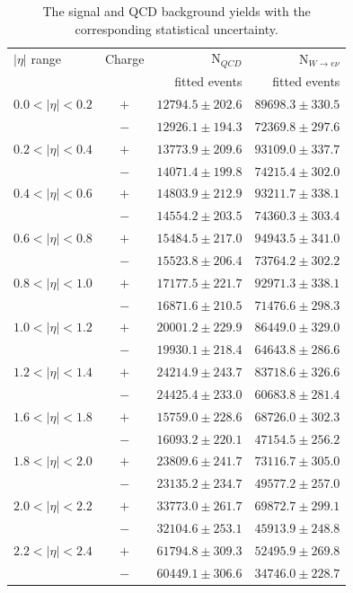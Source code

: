\begin{table}[htbp]
 \begin{center}
 \begin{tabular}{lcrr}
\toprule
$|\eta|$ range &  Charge &  N$_{QCD}$     & N$_{W\rightarrow e \nu}$  \\
               &         & fitted events & fitted events            \\
\midrule
$0.0<| \eta |<0.2$ &  $+$ & $12794.5 \pm 202.6$ &$89698.3\pm330.5$ \\
                   &  $-$ & $12926.1 \pm 194.3$ &$72369.8\pm297.6$ \\ 
$0.2<| \eta |<0.4$ &  $+$ & $13773.9 \pm 209.6$ &$93109.0\pm337.7$ \\
                   &  $-$ & $14071.4 \pm 199.8$ &$74215.4\pm302.0$ \\ 
$0.4<| \eta |<0.6$ &  $+$ & $14803.9 \pm 212.9$ &$93211.7\pm338.1$ \\
                   &  $-$ & $14554.2 \pm 203.5$ &$74360.3\pm303.4$ \\ 
$0.6<| \eta |<0.8$ &  $+$ & $15484.5 \pm 217.0$ &$94943.5\pm341.0$ \\
                   &  $-$ & $15523.8 \pm 206.4$ &$73764.2\pm302.2$ \\ 
$0.8<| \eta |<1.0$ &  $+$ & $17177.5 \pm 221.7$ &$92971.3\pm338.1$ \\
                   &  $-$ & $16871.6 \pm 210.5$ &$71476.6\pm298.3$ \\ 
$1.0<| \eta |<1.2$ &  $+$ & $20001.2 \pm 229.9$ &$86449.0\pm329.0$ \\
                   &  $-$ & $19930.1 \pm 218.4$ &$64643.8\pm286.6$ \\ 
$1.2<| \eta |<1.4$ &  $+$ & $24214.9 \pm 243.7$ &$83718.6\pm326.6$ \\
                   &  $-$ & $24425.4 \pm 233.0$ &$60683.8\pm281.4$ \\ 
$1.6<| \eta |<1.8$ &  $+$ & $15759.0 \pm 228.6$ &$68726.0\pm302.3$ \\
                   &  $-$ & $16093.2 \pm 220.1$ &$47154.5\pm256.2$ \\ 
$1.8<| \eta |<2.0$ &  $+$ & $23809.6 \pm 241.7$ &$73116.7\pm305.0$ \\
                   &  $-$ & $23135.2 \pm 234.7$ &$49577.2\pm257.0$ \\ 
$2.0<| \eta |<2.2$ &  $+$ & $33773.0 \pm 261.7$ &$69872.7\pm299.1$ \\
                   &  $-$ & $32104.6 \pm 253.1$ &$45913.9\pm248.8$ \\ 
$2.2<| \eta |<2.4$ &  $+$ & $61794.8 \pm 309.3$ &$52495.9\pm269.8$ \\
                   &  $-$ & $60449.1 \pm 306.6$ &$34746.0\pm228.7$ \\ 
\bottomrule
 \end{tabular}
 \caption{\label{tab:updatedsigyield} The signal and {QCD} background yields
with the corresponding statistical uncertainty\cite{bendavid2011electron}.}
 \end{center}
\end{table}

